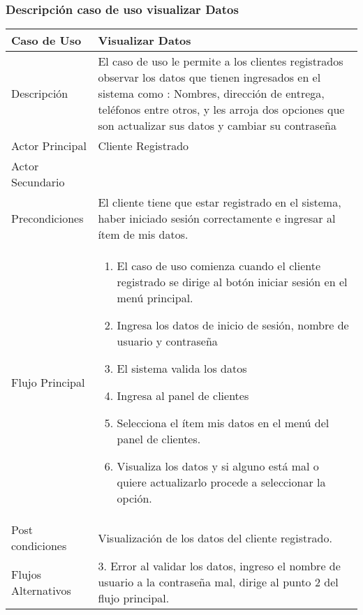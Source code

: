 \documentclass[12pt,a4paper]{article}
\begin{document}
    \newpage
\subsubsection*{Descripción caso de uso visualizar Datos}
\begin{table}[h]
        \centering
        \begin{tabular}{| p{3cm}| p{11cm} |} 
        \hline  
        Caso de Uso         &    \textbf{Visualizar Datos }   \\ 
        \hline
        Descripción         &   El caso de uso le permite a los clientes registrados observar los datos que tienen ingresados en el sistema como : Nombres, dirección de entrega, teléfonos entre otros, y les arroja dos opciones que son actualizar sus datos y cambiar su contraseña    \\ 
        \hline
        Actor Principal     &    Cliente Registrado  \\ 
        \hline
        Actor Secundario    &       \\ 
        \hline
        Precondiciones      &  El cliente tiene que estar registrado en el sistema, haber iniciado sesión correctamente e ingresar al ítem de mis datos.   	\\
        \hline
        Flujo Principal     &    

            \begin{enumerate}
                \item El caso de uso comienza cuando el cliente registrado se dirige al botón iniciar sesión en el menú principal.
                \item Ingresa los datos de inicio de sesión, nombre de usuario y contraseña
                \item El sistema valida los datos
                \item Ingresa al panel de clientes
                \item Selecciona el ítem mis datos en el menú del panel de clientes.
                \item Visualiza los datos y si alguno está mal o quiere actualizarlo procede a seleccionar la opción.
            \end{enumerate}
        \\  
        \hline
        Post condiciones    &  Visualización de los datos del cliente registrado.     \\  
        \hline
        Flujos Alternativos & 3. Error al validar los datos, ingreso el nombre de usuario a la contraseña mal, dirige al punto 2 del flujo principal.      \\  
        \hline
        \end{tabular}
    \end{table}
\end{document}
